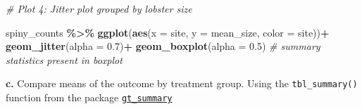 \documentclass[
]{article}
\newenvironment{Shaded}{\begin{snugshade}}{\end{snugshade}}
\newcommand{\AttributeTok}[1]{\textcolor[rgb]{0.13,0.29,0.53}{#1}}
\newcommand{\CommentTok}[1]{\textcolor[rgb]{0.56,0.35,0.01}{\textit{#1}}}
\newcommand{\DecValTok}[1]{\textcolor[rgb]{0.00,0.00,0.81}{#1}}
\newcommand{\FloatTok}[1]{\textcolor[rgb]{0.00,0.00,0.81}{#1}}
\newcommand{\FunctionTok}[1]{\textcolor[rgb]{0.13,0.29,0.53}{\textbf{#1}}}
\newcommand{\NormalTok}[1]{#1}
\newcommand{\SpecialCharTok}[1]{\textcolor[rgb]{0.81,0.36,0.00}{\textbf{#1}}}
\newcommand{\StringTok}[1]{\textcolor[rgb]{0.31,0.60,0.02}{#1}}
\begin{document}
\begin{Shaded}
\end{Shaded}

\begin{Shaded}
\begin{Highlighting}[]
\CommentTok{\# Plot 4: Jitter plot grouped by lobster size}

\NormalTok{spiny\_counts }\SpecialCharTok{\%\textgreater{}\%} 
\FunctionTok{ggplot}\NormalTok{(}\FunctionTok{aes}\NormalTok{(}\AttributeTok{x =}\NormalTok{ site,}
           \AttributeTok{y =}\NormalTok{ mean\_size,}
           \AttributeTok{color =}\NormalTok{ site))}\SpecialCharTok{+}
    \FunctionTok{geom\_jitter}\NormalTok{(}\AttributeTok{alpha =} \FloatTok{0.7}\NormalTok{)}\SpecialCharTok{+}
    \FunctionTok{geom\_boxplot}\NormalTok{(}\AttributeTok{alpha =} \FloatTok{0.5}\NormalTok{) }\CommentTok{\# summary statistics present in boxplot}
\end{Highlighting}
\end{Shaded}

\textbf{c.} Compare means of the outcome by treatment group. Using the
\texttt{tbl\_summary()} function from the package
\href{https://www.danieldsjoberg.com/gtsummary/articles/tbl_summary.html}{\texttt{gt\_summary}}
\end{document}
